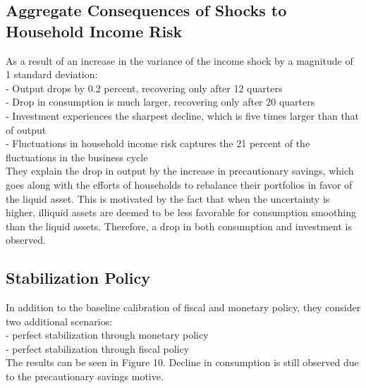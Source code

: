 \documentclass[titlepage]{\econtex}
\begin{document}
\hypertarget{Aggregate Consequences of Shocks to Household Income Risk}{}
\subsection{Aggregate Consequences of Shocks to Household Income Risk}

As a result of an increase in the variance of the income shock by a magnitude of 1 standard deviation:\\
- Output drops by 0.2 percent, recovering only after 12 quarters\\
- Drop in consumption is much larger, recovering only after 20 quarters\\
- Investment experiences the sharpest decline, which is five times larger than that of output\\
- Fluctuations in household income risk captures the 21 percent of the fluctuations in the business cycle\\
They explain the drop in output by the increase in precautionary savings, which goes along with the efforts of households to rebalance their portfolios in favor of the liquid asset. This is motivated by the fact that when the uncertainty is higher, illiquid assets are deemed to be less favorable for consumption smoothing than the liquid assets. Therefore, a drop in both consumption and investment is observed.

\hypertarget{Stabilization Policy}{}
\subsection{Stabilization Policy}

In addition to the baseline calibration of fiscal and monetary policy, they consider two additional scenarios:\\
- perfect stabilization through monetary policy\\
- perfect stabilization through fiscal policy\\
The results can be seen in Figure 10. Decline in consumption is still observed due to the precautionary savings motive.
\end{document}
